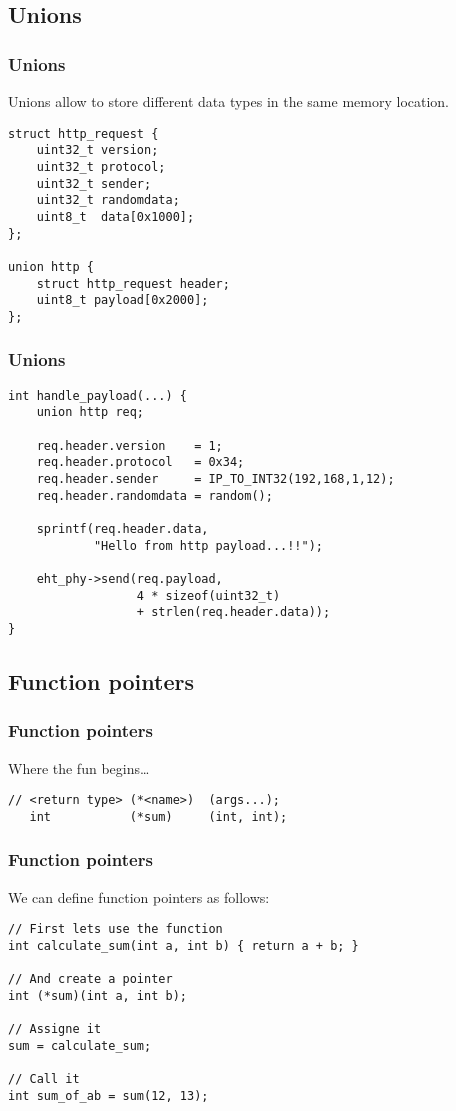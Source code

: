 \documentclass[
	11pt, %
]{beamer}
\newcommand{\ssft}[1]{\subsection{#1}\frametitle{#1}}
\begin{document}
\begin{frame}[fragile]
    \ssft{Unions}

    Unions allow to store different data types in the same memory location.

    \begin{lstlisting}[style=CStyle]
struct http_request {
    uint32_t version;
    uint32_t protocol;
    uint32_t sender;
    uint32_t randomdata;
    uint8_t  data[0x1000];
};

union http {
    struct http_request header;
    uint8_t payload[0x2000];
};

\end{lstlisting}

\end{frame}
\begin{frame}[fragile]
    \frametitle{Unions}

    \begin{lstlisting}[style=CStyle]
int handle_payload(...) {
    union http req;

    req.header.version    = 1;
    req.header.protocol   = 0x34;
    req.header.sender     = IP_TO_INT32(192,168,1,12);
    req.header.randomdata = random();

    sprintf(req.header.data,
            "Hello from http payload...!!");

    eht_phy->send(req.payload,
                  4 * sizeof(uint32_t)
                  + strlen(req.header.data));
}

\end{lstlisting}

\end{frame}

\begin{frame}[fragile]
    \ssft{Function pointers}

    Where the fun begins\ldots

    \bigskip

    \begin{lstlisting}[style=CStyle]
// <return type> (*<name>)  (args...);
   int           (*sum)     (int, int);

\end{lstlisting}

\end{frame}
\begin{frame}[fragile]
    \frametitle{Function pointers}
    We can define function pointers as follows:
    \begin{lstlisting}[style=CStyle]
// First lets use the function
int calculate_sum(int a, int b) { return a + b; }

// And create a pointer
int (*sum)(int a, int b);

// Assigne it
sum = calculate_sum;

// Call it
int sum_of_ab = sum(12, 13);

\end{lstlisting}

\end{frame}
\end{document}
